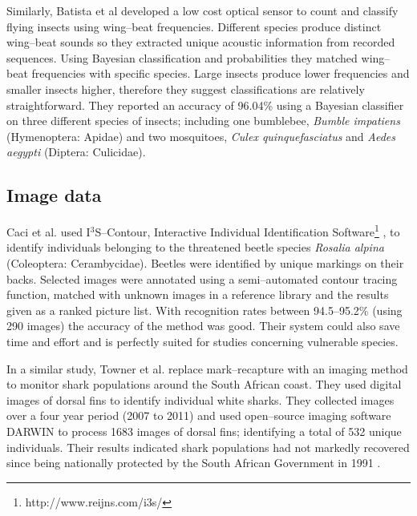 Similarly, Batista et al \cite{Batista2011} developed a low cost optical sensor to count and classify flying insects using wing--beat frequencies.  Different species produce distinct wing--beat sounds so they extracted unique acoustic information from recorded sequences. Using Bayesian classification and probabilities they matched wing--beat frequencies with specific species. Large insects produce lower frequencies and smaller insects higher, therefore they suggest classifications are relatively straightforward. They reported an accuracy of 96.04\% using a Bayesian classifier on three different species of insects; including one bumblebee, \emph{Bumble impatiens} (Hymenoptera: Apidae) and two mosquitoes, \emph{Culex quinquefasciatus} and \emph{Aedes aegypti } (Diptera: Culicidae).

\subsection{Image data}\label{sec:image-data}
Caci et al. \cite{Caci2013} used I$^3$S--Contour, Interactive Individual Identification Software\footnote{http://www.reijns.com/i3s/} \cite{Van2007}, to identify individuals belonging to the threatened beetle species \emph{Rosalia alpina} (Coleoptera: Cerambycidae). \label{Beetle image ID and matching with I$^3$S--Contour.} Beetles were identified by unique markings on their backs. Selected images were annotated using a semi--automated contour tracing function, matched with unknown images in a reference library and the results given as a ranked picture list. With recognition rates between 94.5--95.2\% (using 290 images) the accuracy of the method was good. Their system could also save time and effort and is perfectly suited for studies concerning vulnerable species. 

In a similar study, Towner et al.\cite{Towner2013} replace mark--recapture with an imaging method to monitor shark populations around the South African coast. They used digital images of dorsal fins to identify individual white sharks. They collected images over a four year period (2007 to 2011) and used open--source imaging software DARWIN \cite{Pierrer2006} to process 1683 images of dorsal fins; identifying a total of 532 unique individuals. Their results indicated shark populations had not markedly recovered since being nationally protected by the South African Government in 1991 \cite{Compagno1991}.

